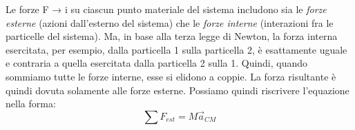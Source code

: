 \documentclass[a4paper,11pt,oneside]{book}
\begin{document}
Le forze F → i su ciascun punto materiale del sistema includono sia le \emph{forze esterne} (azioni dall’esterno del sistema) che le \emph{forze interne} (interazioni fra le particelle del sistema).
Ma, in base alla terza legge di Newton, la forza interna esercitata, per esempio, dalla particella 1 sulla particella 2, è esattamente uguale e contraria a quella esercitata dalla particella 2 sulla 1.
Quindi, quando sommiamo tutte le forze interne, esse si elidono a coppie. La forza risultante è quindi dovuta solamente alle forze esterne. Possiamo quindi riscrivere l'equazione nella forma:
\begin{equation*}
    \sum F_{est} = M\vec{a}_{CM}
\end{equation*}
\end{document}
